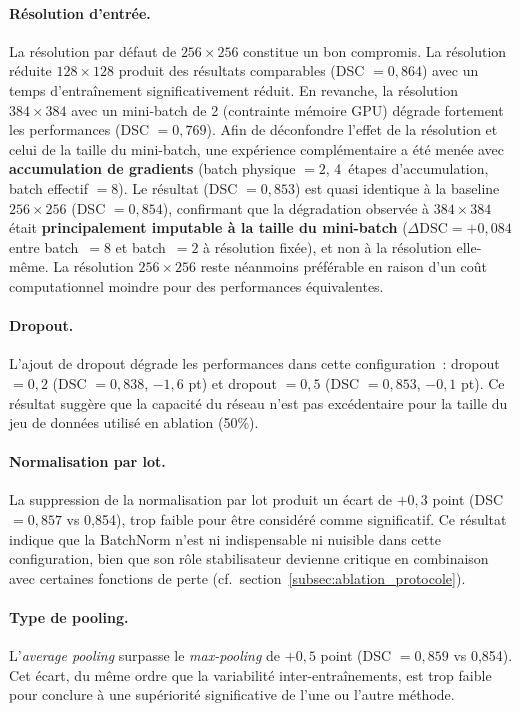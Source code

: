 \documentclass[12pt,a4paper]{article}
\begin{document}
\paragraph{Résolution d'entrée.} La résolution par défaut de $256 \times 256$ constitue un bon compromis. La résolution réduite $128 \times 128$ produit des résultats comparables (DSC $= 0{,}864$) avec un temps d'entraînement significativement réduit. En revanche, la résolution $384 \times 384$ avec un mini-batch de 2 (contrainte mémoire GPU) dégrade fortement les performances (DSC $= 0{,}769$). Afin de déconfondre l'effet de la résolution et celui de la taille du mini-batch, une expérience complémentaire a été menée avec \textbf{accumulation de gradients} (batch physique $= 2$, 4~étapes d'accumulation, batch effectif $= 8$). Le résultat (DSC $= 0{,}853$) est quasi identique à la baseline $256 \times 256$ (DSC $= 0{,}854$), confirmant que la dégradation observée à $384 \times 384$ était \textbf{principalement imputable à la taille du mini-batch} ($\Delta\text{DSC} = +0{,}084$ entre batch~$= 8$ et batch~$= 2$ à résolution fixée), et non à la résolution elle-même. La résolution $256 \times 256$ reste néanmoins préférable en raison d'un coût computationnel moindre pour des performances équivalentes.

\paragraph{Dropout.} L'ajout de dropout dégrade les performances dans cette configuration~: dropout $= 0{,}2$ (DSC $= 0{,}838$, $-1{,}6$ pt) et dropout $= 0{,}5$ (DSC $= 0{,}853$, $-0{,}1$ pt). Ce résultat suggère que la capacité du réseau n'est pas excédentaire pour la taille du jeu de données utilisé en ablation (50\%).

\paragraph{Normalisation par lot.} La suppression de la normalisation par lot \citep{ioffe2015batchnorm} produit un écart de $+0{,}3$ point (DSC $= 0{,}857$ vs 0,854), trop faible pour être considéré comme significatif. Ce résultat indique que la BatchNorm n'est ni indispensable ni nuisible dans cette configuration, bien que son rôle stabilisateur devienne critique en combinaison avec certaines fonctions de perte (cf.\ section~\ref{subsec:ablation_protocole}).

\paragraph{Type de pooling.} L'\emph{average pooling} surpasse le \emph{max-pooling} de $+0{,}5$ point (DSC $= 0{,}859$ vs 0,854). Cet écart, du même ordre que la variabilité inter-entraînements, est trop faible pour conclure à une supériorité significative de l'une ou l'autre méthode.
\end{document}
